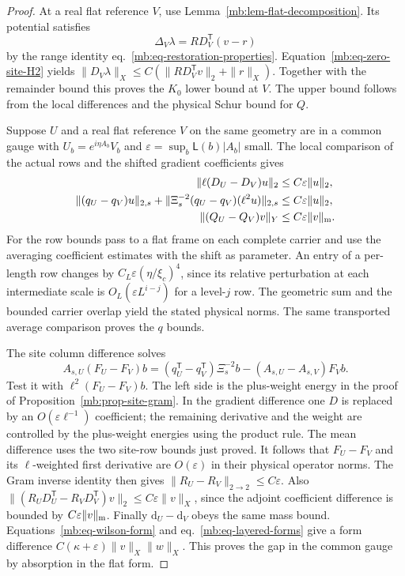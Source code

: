 \documentclass[11pt,letterpaper,reqno]{amsart}
\numberwithin{equation}{section}
\renewcommand{\eqref}[1]{\textup{eq.~\ref{#1}}}
\theoremstyle{definition}
\theoremstyle{remark}
\begin{document}
\begin{proof}
At a real flat reference \(V\), use
Lemma~\ref{mb:lem-flat-decomposition}. Its potential satisfies
\[
 \Delta_V\lambda=R D_V^{\mathsf T}(v-r)
\]
by the range identity \eqref{mb:eq-restoration-properties}.
Equation~\ref{mb:eq-zero-site-H2} yields
\(\|D_V\lambda\|_X\le C(\|R D_V^{\mathsf T}v\|_2+\|r\|_X)\).
Together with the remainder bound this proves the \(K_0\)
lower bound at \(V\). The upper bound follows from the
local differences and the physical Schur bound for \(Q\).

Suppose \(U\) and a real flat reference \(V\) on the same
geometry are in a common gauge with
\(U_b=e^{i\eta A_b}V_b\) and
\(\varepsilon=\sup_b\mathsf L(b)|A_b|\) small.
The local comparison of the actual rows and the shifted
gradient coefficients gives
\[
 \begin{split}
 \|\ell(D_U-D_V)u\|_2 &\le C\varepsilon\|u\|_2,\\
 \|(q_U-q_V)u\|_{2,s}
 +\|\Xi_s^{-2}(q_U-q_V)(\ell^2u)\|_{2,s}
                                      &\le C\varepsilon\|u\|_2,\\
 \|(Q_U-Q_V)v\|_Y&\le C\varepsilon\|v\|_{\rm m}.
 \end{split}
\]
For the row bounds pass to a flat frame on each complete
carrier and use the averaging coefficient estimates with
the shift as parameter. An entry of a per-length row
changes by \(C_L\varepsilon(\eta/\xi_c)^4\), since its
relative perturbation at each intermediate scale is
\(O_L(\varepsilon L^{i-j})\) for a level-\(j\) row.
The geometric sum and the bounded carrier overlap yield
the stated physical norms. The same transported average
comparison proves the \(q\) bounds.

The site column difference solves
\[
 A_{s,U}(F_U-F_V)b
  =(q_U^{\mathsf T}-q_V^{\mathsf T})\Xi_s^{-2}b
                    -(A_{s,U}-A_{s,V})F_Vb .
\]
Test it with \(\ell^2(F_U-F_V)b\).
The left side is the plus-weight energy in the proof of
Proposition~\ref{mb:prop-site-gram}. In the gradient
difference one \(D\) is replaced by an \(O(\varepsilon
\ell^{-1})\) coefficient; the remaining derivative and
the weight are controlled by the plus-weight energies
using the product rule. The mean difference uses the
two site-row bounds just proved. It follows that
\(F_U-F_V\) and its \(\ell\)-weighted first derivative
are \(O(\varepsilon)\) in their physical operator norms.
The Gram inverse identity then gives
\(\|R_U-R_V\|_{2\to2}\le C\varepsilon\).
Also
\(\|(R_U D_U^{\mathsf T}-R_VD_V^{\mathsf T})v\|_2
 \le C\varepsilon\|v\|_X\),
since the adjoint coefficient difference is bounded by
\(C\varepsilon\|v\|_{\rm m}\).
Finally \(\mathrm d_U-\mathrm d_V\) obeys the same mass
bound. Equations~\ref{mb:eq-wilson-form} and
\eqref{mb:eq-layered-forms} give a form difference
\(C(\kappa+\varepsilon)\|v\|_X\|w\|_X\). This proves the
gap in the common gauge by absorption in the flat form.


\end{proof}
\end{document}
